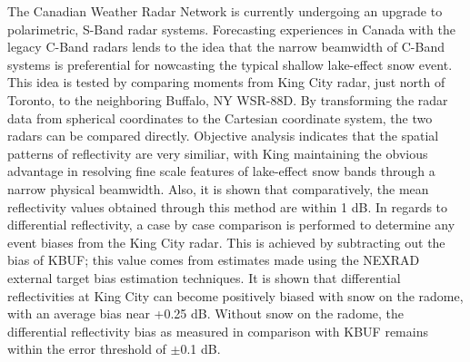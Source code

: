 The Canadian Weather Radar Network is currently undergoing an upgrade to polarimetric, S-Band radar 
systems. Forecasting experiences in Canada with the legacy C-Band radars lends to the idea that the 
narrow beamwidth of C-Band systems is preferential for nowcasting the typical shallow lake-effect snow 
event. This idea is tested by comparing moments from King City radar, just north of Toronto, to the 
neighboring Buffalo, NY WSR-88D. By transforming the radar data from spherical coordinates to the 
Cartesian coordinate system, the two radars can be compared directly. Objective analysis indicates that 
the spatial patterns of reflectivity are very similiar, with King maintaining the obvious advantage in 
resolving fine scale features of lake-effect snow bands through a narrow physical beamwidth. Also, it is 
shown that comparatively, the mean reflectivity values obtained through this method are within 1 dB. In
regards to differential reflectivity, a case by case comparison is performed to determine any event biases
from the King City radar. This is achieved by subtracting out the bias of KBUF; this value comes from 
estimates made using the NEXRAD external target bias estimation techniques. It is shown that 
differential reflectivities at King City can become positively biased with snow on the radome, with an average bias near +0.25 dB. Without snow on the radome, the differential reflectivity 
bias as measured in comparison with KBUF remains within the error threshold of $\pm$0.1 dB.